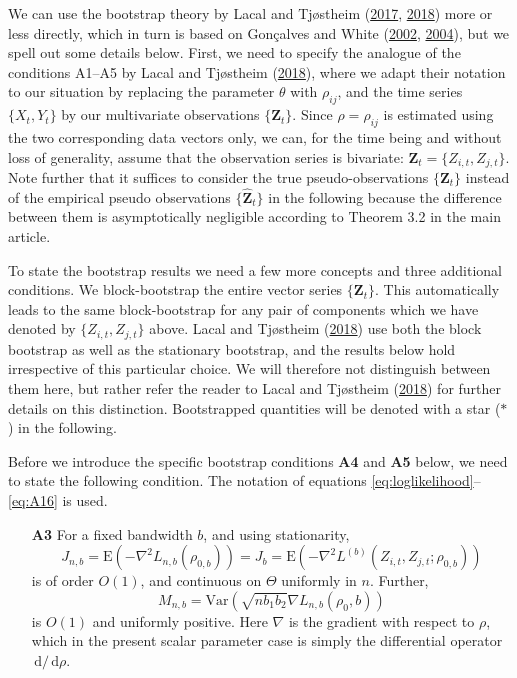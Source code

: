 \documentclass[
  12pt,
  letterpaper]{article}
\numberwithin{equation}{section}
\newcommand{\Z}{\bm{Z}}
\newcommand{\hZ}{\widehat{\bm{Z}}}
\newcommand{\E}{\textrm{E}}
\newcommand{\Var}{\textrm{Var}}
\newcommand{\di}{\,\textrm{d}}
\begin{document}
We can use the bootstrap theory by Lacal and Tjøstheim (\protect\hyperlink{ref-lacal2017local}{2017}, \protect\hyperlink{ref-lacal2018estimating}{2018}) more or less directly, which in turn is based on Gon\c{c}alves and White (\protect\hyperlink{ref-gonccalves2002bootstrap}{2002}, \protect\hyperlink{ref-gonccalves2004maximum}{2004}), but we spell out some details below. First, we need to specify the analogue of the conditions A1--A5 by Lacal and Tjøstheim (\protect\hyperlink{ref-lacal2018estimating}{2018}), where we adapt their notation to our situation by replacing the parameter \(\theta\) with \(\rho_{ij}\), and the time series \(\{X_t, Y_t\}\) by our multivariate observations \(\{\Z_t\}\). Since \(\rho = \rho_{ij}\) is estimated using the two corresponding data vectors only, we can, for the time being and without loss of generality, assume that the observation series is bivariate: \({\Z_t} = \{Z_{i,t}, Z_{j,t}\}\). Note further that it suffices to consider the true pseudo-observations \(\{\Z_t\}\) instead of the empirical pseudo observations \(\{\hZ_t\}\) in the following because the difference between them is asymptotically negligible according to Theorem 3.2 in the main article.

To state the bootstrap results we need a few more concepts and three additional conditions. We block-bootstrap the entire vector series \(\{\Z_t\}\). This automatically leads to the same block-bootstrap for any pair of components which we have denoted by \(\{Z_{i,t}, Z_{j,t}\}\) above. Lacal and Tjøstheim (\protect\hyperlink{ref-lacal2018estimating}{2018}) use both the block bootstrap as well as the stationary bootstrap, and the results below hold irrespective of this particular choice. We will therefore not distinguish between them here, but rather refer the reader to Lacal and Tjøstheim (\protect\hyperlink{ref-lacal2018estimating}{2018}) for further details on this distinction. Bootstrapped quantities will be denoted with a star (\(*\)) in the following.

Before we introduce the specific bootstrap conditions \textbf{A4} and \textbf{A5} below, we need to state the following condition. The notation of equations \eqref{eq:loglikelihood}--\eqref{eq:A16} is used.

\begin{itemize}
\item[\textbf{A3}] For a fixed bandwidth $b$, and using stationarity,
$$J_{n,b} = \E\left(-\nabla^2L_{n,b}(\rho_{0,b})\right) = J_b = \E\left(-\nabla^2 L^{(b)}(Z_{i,t}, Z_{j,t};\rho_{0,b})\right)$$
is of order $O(1)$, and continuous on $\Theta$ uniformly in $n$. Further,
$$M_{n,b} = \Var\left(\sqrt{nb_1b_2}\nabla L_{n,b}(\rho_0,b)\right)$$
is $O(1)$ and uniformly positive. Here $\nabla$ is the gradient with respect to $\rho$, which in the present scalar parameter case is simply the differential operator $\di/\di\rho$.
\end{itemize}
\end{document}
